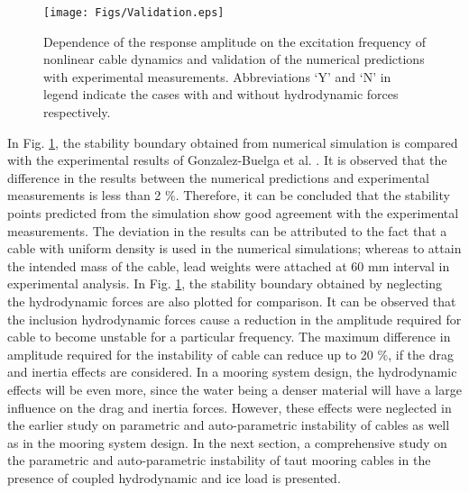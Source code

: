 \documentclass[review]{elsarticle}
\begin{document}
\begin{figure}
	\centering
	\texttt{[image: Figs/Validation.eps]}
	\caption{ Dependence of the response amplitude on the excitation frequency of nonlinear cable dynamics and validation of the numerical predictions with experimental measurements. Abbreviations `Y' and `N' in legend indicate the cases with and without hydrodynamic forces respectively. }
	\label{valid}
\end{figure}

In Fig. \ref{valid}, the stability boundary obtained from numerical simulation is compared with the experimental results of Gonzalez-Buelga et al. \cite{Gonzalez_2008}. It is observed that the difference in the results between the numerical predictions and experimental measurements is less than 2 $\%$. Therefore, it can be concluded that the stability points predicted from the simulation show good agreement with the experimental measurements. The deviation in the results can be attributed to the fact that a cable with uniform density is used in the numerical simulations; whereas to attain the intended mass of the cable, lead weights were attached at $60$ mm interval in experimental analysis. In Fig. \ref{valid}, the stability boundary obtained by neglecting the hydrodynamic forces are also plotted for comparison. It can be observed that the inclusion hydrodynamic forces cause a reduction in the amplitude required for cable to become unstable for a particular frequency. The maximum difference in amplitude required for the instability of cable can reduce up to 20 $\%$, if the drag and inertia effects are considered. In a mooring system design, the hydrodynamic effects will be even more, since the water being a denser material will have a large influence on the drag and inertia forces. However, these effects were neglected in the earlier study on parametric and auto-parametric instability of cables as well as in the mooring system design. In the next section, a comprehensive study on the parametric and auto-parametric instability of taut mooring cables in the presence of coupled hydrodynamic and ice load is presented.

\end{document}
